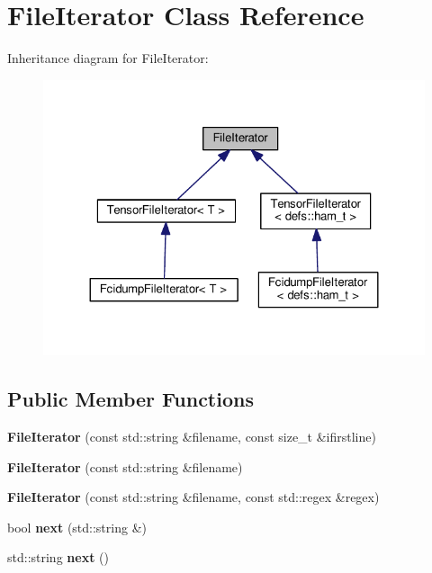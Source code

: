 \hypertarget{classFileIterator}{}\section{File\+Iterator Class Reference}
\label{classFileIterator}


Inheritance diagram for File\+Iterator\+:\nopagebreak
\begin{figure}[H]
\begin{center}
\leavevmode
\includegraphics[width=324pt]{classFileIterator__inherit__graph}
\end{center}
\end{figure}
\subsection*{Public Member Functions}
\begin{DoxyCompactItemize}
\item 
{\bfseries File\+Iterator} (const std\+::string \&filename, const size\+\_\+t \&ifirstline)\hypertarget{classFileIterator_a664201608652425655f7631194fc8a5f}{}\label{classFileIterator_a664201608652425655f7631194fc8a5f}

\item 
{\bfseries File\+Iterator} (const std\+::string \&filename)\hypertarget{classFileIterator_a72bdb8a60601e50cc74fa31a3031539e}{}\label{classFileIterator_a72bdb8a60601e50cc74fa31a3031539e}

\item 
{\bfseries File\+Iterator} (const std\+::string \&filename, const std\+::regex \&regex)\hypertarget{classFileIterator_ada8942b79a19dae2a0b668949ac08912}{}\label{classFileIterator_ada8942b79a19dae2a0b668949ac08912}

\item 
bool {\bfseries next} (std\+::string \&)\hypertarget{classFileIterator_a4d395f3fce39962f4a754868143fc318}{}\label{classFileIterator_a4d395f3fce39962f4a754868143fc318}

\item 
std\+::string {\bfseries next} ()\hypertarget{classFileIterator_ad362a010af079bcbfbccdfcc50488b0d}{}\label{classFileIterator_ad362a010af079bcbfbccdfcc50488b0d}

\end{DoxyCompactItemize}

